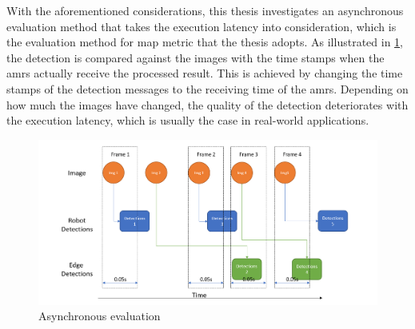 With the aforementioned considerations, this thesis investigates an asynchronous evaluation method that takes the execution latency into consideration, which is the evaluation method for \gls{map} metric that the thesis adopts. As illustrated in \cref{fig:async_eval}, the detection is compared against the images with the time stamps when the \glspl{amr} actually receive the processed result. This is achieved by changing the time stamps of the detection messages to the receiving time of the \glspl{amr}. Depending on how much the images have changed, the quality of the detection deteriorates with the execution latency, which is usually the case in real-world applications.

\begin{figure}[htp]
    \centering
    \includegraphics[width=120mm]{figures/setup/async_eval.png}
    \caption{Asynchronous evaluation}
    \label{fig:async_eval}
\end{figure}
